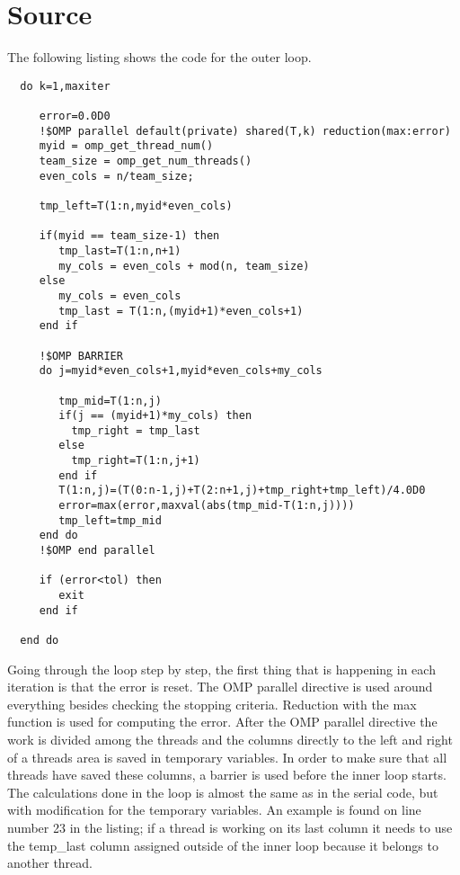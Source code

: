 \documentclass[a4paper, 12pt]{article}
\begin{document}
\newpage

\section{Source}
\label{sec:src}
The following listing shows the code for the outer loop.

\begin{lstlisting}
  do k=1,maxiter
     
     error=0.0D0
     !$OMP parallel default(private) shared(T,k) reduction(max:error)
     myid = omp_get_thread_num()
     team_size = omp_get_num_threads()
     even_cols = n/team_size;

     tmp_left=T(1:n,myid*even_cols)

     if(myid == team_size-1) then
        tmp_last=T(1:n,n+1)
        my_cols = even_cols + mod(n, team_size)
     else 
        my_cols = even_cols
        tmp_last = T(1:n,(myid+1)*even_cols+1)
     end if

     !$OMP BARRIER
     do j=myid*even_cols+1,myid*even_cols+my_cols

        tmp_mid=T(1:n,j)
        if(j == (myid+1)*my_cols) then
          tmp_right = tmp_last
        else
          tmp_right=T(1:n,j+1)
        end if
        T(1:n,j)=(T(0:n-1,j)+T(2:n+1,j)+tmp_right+tmp_left)/4.0D0
        error=max(error,maxval(abs(tmp_mid-T(1:n,j))))
        tmp_left=tmp_mid
     end do
     !$OMP end parallel
     
     if (error<tol) then
        exit
     end if
     
  end do
\end{lstlisting}

Going through the loop step by step, the first thing that is happening in each
iteration is that the error is reset. The OMP parallel directive is used around
everything besides checking the stopping criteria. Reduction with the max
function is used for computing the error. After the OMP parallel directive the
work is divided among the threads and the columns directly to the left and right
of a threads area is saved in temporary variables. In order to make sure that
all threads have saved these columns, a barrier is used before the inner loop
starts. The calculations done in the loop is almost the same as in the serial
code, but with modification for the temporary variables. An example is found on
line number 23 in the listing; if a thread is working on its
last column it needs to use the temp\_last column assigned outside of the inner
loop because it belongs to another thread. 

\end{document}
